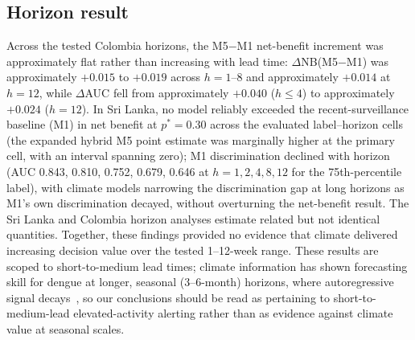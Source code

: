 \documentclass[11pt,a4paper]{article}
\begin{document}
\subsection{Horizon result}
Across the tested Colombia horizons, the M5$-$M1 net-benefit increment was approximately flat rather than increasing with lead time: $\Delta$NB(M5$-$M1) was approximately $+0.015$ to $+0.019$ across $h=1$--8 and approximately $+0.014$ at $h=12$, while $\Delta$AUC fell from approximately $+0.040$ ($h\le4$) to approximately $+0.024$ ($h=12$). In Sri Lanka, no model reliably exceeded the recent-surveillance baseline (M1) in net benefit at $p^*=0.30$ across the evaluated label--horizon cells (the expanded hybrid M5 point estimate was marginally higher at the primary cell, with an interval spanning zero); M1 discrimination declined with horizon (AUC 0.843, 0.810, 0.752, 0.679, 0.646 at $h=1,2,4,8,12$ for the 75th-percentile label), with climate models narrowing the discrimination gap at long horizons as M1's own discrimination decayed, without overturning the net-benefit result. The Sri Lanka and Colombia horizon analyses estimate related but not identical quantities. Together, these findings provided no evidence that climate delivered increasing decision value over the tested 1--12-week range. These results are scoped to short-to-medium lead times; climate information has shown forecasting skill for dengue at longer, seasonal (3--6-month) horizons, where autoregressive signal decays~\cite{Beal2025,ColonGonzalez2021}, so our conclusions should be read as pertaining to short-to-medium-lead elevated-activity alerting rather than as evidence against climate value at seasonal scales.
\end{document}
